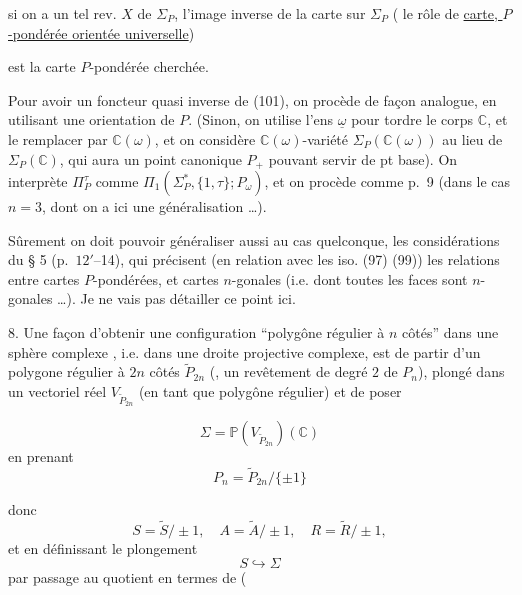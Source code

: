 si on a un tel rev.  $X$ de $\Sigma_P$, l'image inverse de la carte   sur $\Sigma_P$ ( le rôle de \uline{carte, $P$-pondérée orientée universelle})

est la carte $P$-pondérée  cherchée.

Pour avoir un foncteur quasi inverse de (101), on procède de façon analogue, en utilisant une orientation de $P$. (Sinon, on utilise l'ens $\underline\omega$ pour tordre le corps $\mathbb C$, et le remplacer par $\mathbb C(\omega)$, et on considère  $\mathbb C(\omega)$-variété $\Sigma_P(\mathbb C(\omega))$ au lieu de $\Sigma_P(\mathbb C)$, qui aura un point canonique $P_+$ pouvant servir de pt base). On  interprète $\Pi_P^\tau$ comme $\Pi_1(\Sigma_P^*,\{1,\tau\};P_\omega)$, et on procède comme p.~9 (dans le cas $n=3$, dont on a ici une généralisation \ldots).

Sûrement on doit pouvoir généraliser aussi au cas quelconque, les considérations du § 5 (p.~$12'$--14), qui précisent (en relation avec  les iso. (97) (99)) les relations entre cartes $P$-pondérées, et cartes $n$-gonales (i.e. dont toutes les faces sont $n$-gonales \ldots). Je ne vais pas détailler ce point ici.

8. Une façon d'obtenir une configuration ``polygône régulier à $n$ côtés''  dans une sphère complexe \inserted{$\Sigma$},  i.e. dans une droite projective complexe, est de partir d'un polygone régulier à $2n$ côtés $\widetilde P_{2n}$ (, un revêtement de degré $2$ de $P_n$), plongé dans un   vectoriel réel $V_{\widetilde P_{2n}}$ (en tant que polygône régulier) et de poser


\[
\tag{1}\Sigma=\mathbb P(V_{\widetilde P_{2n}})(\mathbb C)
\]
en prenant
\[
\tag{2}P_n=\widetilde P_{2n}/\{\pm1\}
\]

 donc
\[
S=\widetilde S/\pm1,\quad A=\widetilde A/\pm1,\quad R=\widetilde R/\pm1,
\]
et en définissant le plongement
\[
\tag{3}S\hookrightarrow\Sigma
\]
par passage au quotient en termes de
(

